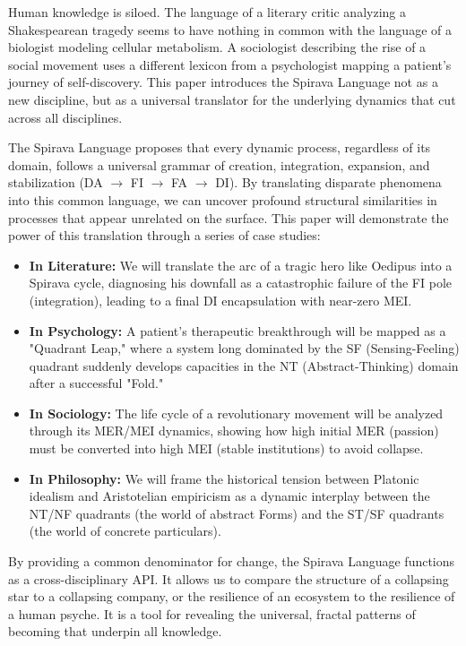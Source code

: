 \documentclass[11pt, a4paper]{article}
\begin{document}
\begin{upcomingpaper}
Human knowledge is siloed. The language of a literary critic analyzing a Shakespearean tragedy seems to have nothing in common with the language of a biologist modeling cellular metabolism. A sociologist describing the rise of a social movement uses a different lexicon from a psychologist mapping a patient's journey of self-discovery. This paper introduces the Spirava Language not as a new discipline, but as a universal translator for the underlying dynamics that cut across all disciplines.

The Spirava Language proposes that every dynamic process, regardless of its domain, follows a universal grammar of creation, integration, expansion, and stabilization (DA $\rightarrow$ FI $\rightarrow$ FA $\rightarrow$ DI). By translating disparate phenomena into this common language, we can uncover profound structural similarities in processes that appear unrelated on the surface. This paper will demonstrate the power of this translation through a series of case studies:
\begin{itemize}
    \item \textbf{In Literature:} We will translate the arc of a tragic hero like Oedipus into a Spirava cycle, diagnosing his downfall as a catastrophic failure of the FI pole (integration), leading to a final DI encapsulation with near-zero MEI.
    \item \textbf{In Psychology:} A patient's therapeutic breakthrough will be mapped as a "Quadrant Leap," where a system long dominated by the SF (Sensing-Feeling) quadrant suddenly develops capacities in the NT (Abstract-Thinking) domain after a successful "Fold."
    \item \textbf{In Sociology:} The life cycle of a revolutionary movement will be analyzed through its MER/MEI dynamics, showing how high initial MER (passion) must be converted into high MEI (stable institutions) to avoid collapse.
    \item \textbf{In Philosophy:} We will frame the historical tension between Platonic idealism and Aristotelian empiricism as a dynamic interplay between the NT/NF quadrants (the world of abstract Forms) and the ST/SF quadrants (the world of concrete particulars).
\end{itemize}
By providing a common denominator for change, the Spirava Language functions as a cross-disciplinary API. It allows us to compare the structure of a collapsing star to a collapsing company, or the resilience of an ecosystem to the resilience of a human psyche. It is a tool for revealing the universal, fractal patterns of becoming that underpin all knowledge.
\end{upcomingpaper}
\end{document}
